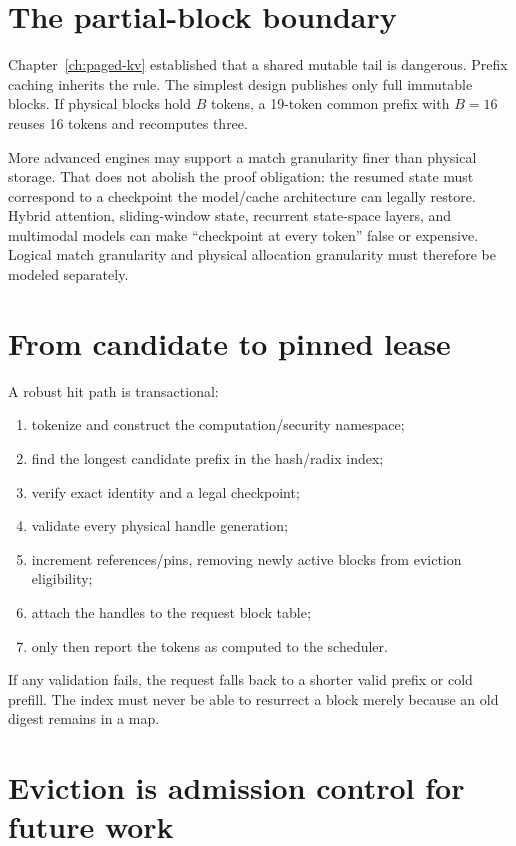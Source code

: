 \section{The partial-block boundary}

Chapter~\ref{ch:paged-kv} established that a shared mutable tail is dangerous. Prefix
caching inherits the rule. The simplest design publishes only full immutable blocks.
If physical blocks hold $B$ tokens, a 19-token common prefix with $B=16$ reuses 16
tokens and recomputes three.

More advanced engines may support a match granularity finer than physical storage.
That does not abolish the proof obligation: the resumed state must correspond to a
checkpoint the model/cache architecture can legally restore. Hybrid attention,
sliding-window state, recurrent state-space layers, and multimodal models can make
``checkpoint at every token'' false or expensive. Logical match granularity and
physical allocation granularity must therefore be modeled separately.

\section{From candidate to pinned lease}

A robust hit path is transactional:
\begin{enumerate}
\item tokenize and construct the computation/security namespace;
\item find the longest candidate prefix in the hash/radix index;
\item verify exact identity and a legal checkpoint;
\item validate every physical handle generation;
\item increment references/pins, removing newly active blocks from eviction eligibility;
\item attach the handles to the request block table;
\item only then report the tokens as computed to the scheduler.
\end{enumerate}

If any validation fails, the request falls back to a shorter valid prefix or cold
prefill. The index must never be able to resurrect a block merely because an old
digest remains in a map.

\section{Eviction is admission control for future work}

